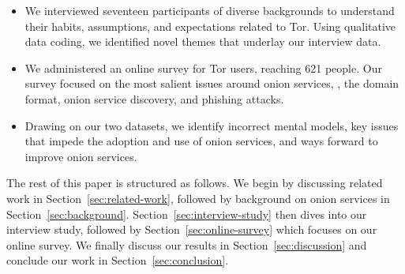 \begin{itemize}
    \item We interviewed seventeen participants of diverse backgrounds to
        understand their habits, assumptions, and expectations related to Tor.
        Using qualitative data coding, we identified novel themes that underlay
        our interview data.

    \item We administered an online survey for Tor users, reaching 621 people.
        Our survey focused on the most salient issues around onion services,
        \eg, the domain format, onion service discovery, and phishing attacks.

    \item Drawing on our two datasets, we identify \first incorrect mental
        models, \second key issues that impede the adoption and use of onion
        services, and \third ways forward to improve onion services.
\end{itemize}

The rest of this paper is structured as follows.  We begin by discussing related
work in Section~\ref{sec:related-work}, followed by background on onion services
in Section~\ref{sec:background}.  Section~\ref{sec:interview-study} then dives
into our interview study, followed by Section~\ref{sec:online-survey} which
focuses on our online survey.  We finally discuss our results in
Section~\ref{sec:discussion} and conclude our work in
Section~\ref{sec:conclusion}.
